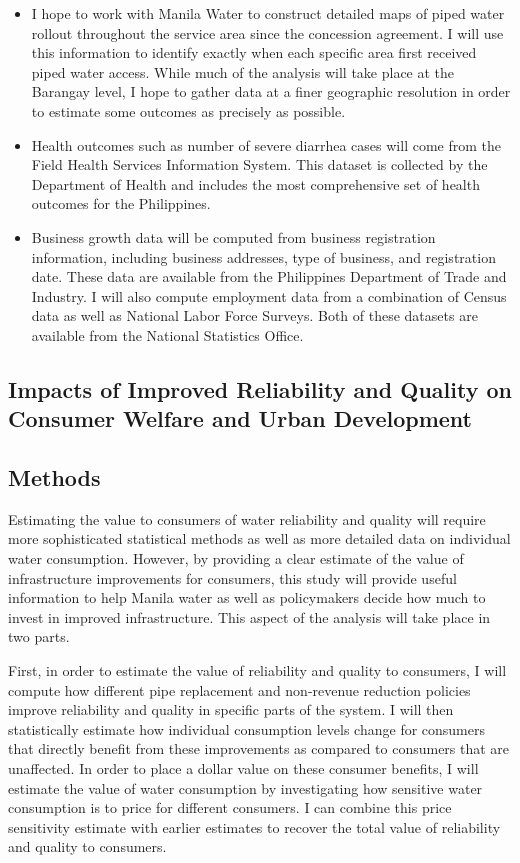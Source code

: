 \documentclass{article}
\begin{document}
\begin{itemize}
\item I hope to work with Manila Water to construct detailed maps of piped water rollout throughout the service area since the concession agreement.  I will use this information to identify exactly when each specific area first received piped water access.  While much of the analysis will take place at the Barangay level, I hope to gather data at a finer geographic resolution in order to estimate some outcomes as precisely as possible.
\item Health outcomes such as number of severe diarrhea cases will come from the Field Health Services Information System.  This dataset is collected by the Department of Health and includes the most comprehensive set of health outcomes for the Philippines.
\item Business growth data will be computed from business registration information, including business addresses, type of business, and registration date.  These data are available from the Philippines Department of Trade and Industry.  I will also compute employment data from a combination of Census data as well as National Labor Force Surveys.  Both of these datasets are available from the National Statistics Office.
\end{itemize}

\subsection{Impacts of Improved Reliability and Quality on Consumer Welfare and Urban Development}

\subsection*{Methods}

Estimating the value to consumers of water reliability and quality will require more sophisticated statistical methods as well as more detailed data on individual water consumption.  However, by providing a clear estimate of the value of infrastructure improvements for consumers, this study will provide useful information to help Manila water as well as policymakers decide how much to invest in improved infrastructure.  This aspect of the analysis will take place in two parts.

First, in order to estimate the value of reliability and quality to consumers, I will compute how different pipe replacement and non-revenue reduction policies improve reliability and quality in specific parts of the system.  I will then statistically estimate how individual consumption levels change for consumers that directly benefit from these improvements as compared to consumers that are unaffected.  In order to place a dollar value on these consumer benefits, I will estimate the value of water consumption by investigating how sensitive water consumption is to price for different consumers.  I can combine this price sensitivity estimate with earlier estimates to recover the total value of reliability and quality to consumers.
\end{document}
